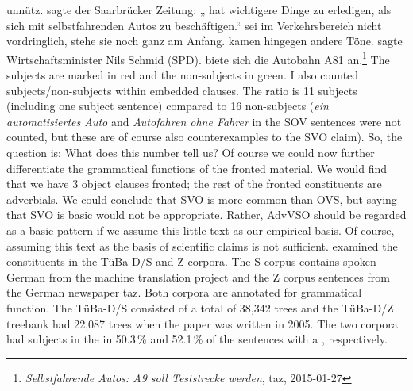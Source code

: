 unnütz.  sagte der Saarbrücker Zeitung: „ hat wichtigere Dinge zu erledigen, als sich mit selbstfahrenden Autos zu beschäftigen.“
 sei im Verkehrsbereich nicht vordringlich,  stehe sie noch ganz am
Anfang.  
kamen hingegen andere Töne.  sagte Wirtschaftsminister Nils Schmid (SPD).  biete sich die Autobahn A81 an.\footnote{\emph{Selbstfahrende Autos: A9 soll Teststrecke werden}, taz, 2015-01-27}
\z
The subjects are marked in red and the non-subjects in green. I also counted subjects/non-subjects
within embedded clauses. The ratio is 11 subjects (including one subject sentence) compared to 16
non-subjects (\emph{ein automatisiertes Auto} and \emph{Autofahren ohne Fahrer} in the SOV sentences were not counted, but these are
of course also counterexamples to the SVO claim). So, the question is: What does
this number tell us? Of course we could now further differentiate the grammatical functions of the
fronted material. We would find that we have 3 object clauses fronted; the rest of the fronted
constituents are adverbials. We could conclude that SVO is more common than OVS, but saying that SVO
is basic would not be appropriate. Rather, AdvVSO should be regarded as a basic pattern if we
assume this little text as our empirical basis. Of course, assuming this text as the basis of
scientific claims is not sufficient. 
\citet[Section~4]{HK2005a} examined the \vf
constituents in the TüBa-D/S and Z corpora. The S corpus contains spoken German from the machine
translation project \verbmobil and the Z corpus sentences from the German newspaper taz. Both
corpora are annotated for grammatical function. The TüBa-D/S consisted of a total of 38,342 trees
and the TüBa-D/Z treebank had 22,087 trees when the paper was written in 2005. The two corpora had
subjects in the \vf in 50.3\,\% and 52.1\,\% of the sentences with a \vf, respectively. 
